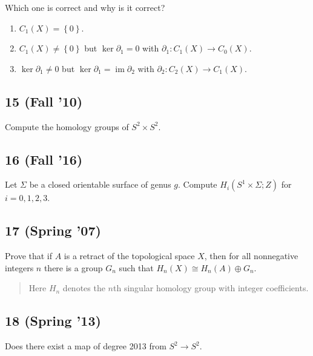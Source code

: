 Which one is correct and why is it correct?

\begin{enumerate}
\def\labelenumi{\alph{enumi}.}
\item
  \(C_1 (X) = \left\{{0}\right\}\).
\item
  \(C_1 (X) \neq \left\{{0}\right\}\) but \(\ker \partial_1 = 0\) with
  \(\partial_1 : C_1 (X) \to C_0 (X)\).
\item
  \(\ker \partial_1 \neq 0\) but
  \(\ker \partial_1 = \operatorname{im}\partial_2\) with
  \(\partial_2 : C_2 (X) \to C_1 (X)\).
\end{enumerate}

\hypertarget{fall-10-1}{%
\subsection{15 (Fall '10)}\label{fall-10-1}}

Compute the homology groups of \(S^2 \times S^2\).

\hypertarget{fall-16-5}{%
\subsection{16 (Fall '16)}\label{fall-16-5}}

Let \(\Sigma\) be a closed orientable surface of genus \(g\). Compute
\(H_i(S^1 \times \Sigma; Z)\) for \(i = 0, 1, 2, 3\).

\hypertarget{spring-07-2}{%
\subsection{17 (Spring '07)}\label{spring-07-2}}

Prove that if \(A\) is a retract of the topological space \(X\), then
for all nonnegative integers \(n\) there is a group \(G_n\) such that
\(H_{n} (X) \cong H_{n} (A) \oplus G_n\).

\begin{quote}
Here \(H_{n}\) denotes the \(n\)th singular homology group with integer
coefficients.
\end{quote}

\hypertarget{spring-13-3}{%
\subsection{18 (Spring '13)}\label{spring-13-3}}

Does there exist a map of degree 2013 from \(S^2 \to S^2\).

